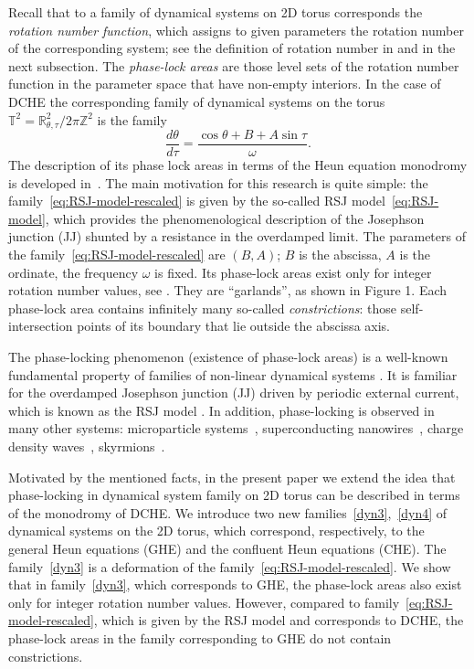 \documentclass[preprint,12pt]{elsarticle}
\theoremstyle{plain}
\numberwithin{equation}{section}
\numberwithin{equation}{section}
\begin{document}
Recall that to a family of dynamical systems on 2D torus corresponds the {\it rotation number function}, which assigns to given parameters the rotation number of the corresponding system; see the definition of rotation number in \cite{arn} and in the next subsection. The {\it phase-lock areas} are those level sets of the rotation number function in the parameter space that have non-empty interiors. In the case of DCHE the corresponding family of dynamical systems on the torus $\mathbb T^2=\mathbb R^2_{\theta,\tau}\slash2\pi\mathbb Z^2$ 
is the family 
\begin{equation}\label{eq:RSJ-model-rescaled}
    \frac{d\theta}{d\tau}=\frac{\cos\theta+B+A\sin\tau}{\omega}.
\end{equation}
The description of its phase lock areas in terms of the Heun equation monodromy is developed in~\cite{buchstaber2017monodromy}. The main motivation for this research is quite simple: the family~\eqref{eq:RSJ-model-rescaled} is given by the so-called RSJ model~\eqref{eq:RSJ-model}, which provides the phenomenological description of the Josephson junction (JJ) shunted by a resistance in the overdamped limit. The parameters of the family~\eqref{eq:RSJ-model-rescaled} are $(B,A)$; $B$ is the abscissa, $A$ is the ordinate, the frequency $\omega$ is fixed. Its phase-lock areas exist only for integer rotation number values, see \cite{buchstaber2010rotation}. They are ``garlands'', as shown in Figure 1. Each phase-lock area contains infinitely many so-called {\it constrictions}: those self-intersection points of its boundary that lie outside the abscissa axis.

The phase-locking phenomenon (existence of phase-lock areas) is a well-known fundamental property of families of non-linear dynamical systems \cite{pikovsky2001synchronization,arn}. It is familiar for the overdamped Josephson junction (JJ) driven by periodic external current, which is known as the RSJ model \cite{mccumber1968effect}. In addition, phase-locking is observed in many other systems: microparticle systems~\cite{mishra2025phase}, superconducting nanowires~\cite{dinsmore2008}, charge density waves~\cite{gruner1985charge}, skyrmions~\cite{reichhardt2015shapiro}.

Motivated by the mentioned facts, in the present paper we extend the idea that phase-locking in dynamical system family on 2D torus can be described in terms of the monodromy of DCHE. We introduce two new families~\eqref{dyn3},~\eqref{dyn4}  of dynamical systems on the 2D torus, which correspond, respectively, to the general Heun equations (GHE) and the confluent Heun equations (CHE). The family~\eqref{dyn3} is a deformation of the family~\eqref{eq:RSJ-model-rescaled}. We show that in family~\eqref{dyn3}, which corresponds to GHE, the phase-lock areas also exist only for integer rotation number values. However, compared to family~\eqref{eq:RSJ-model-rescaled}, which is given by the RSJ model and corresponds to DCHE, the phase-lock areas in the family corresponding to GHE do not contain constrictions.
\end{document}
